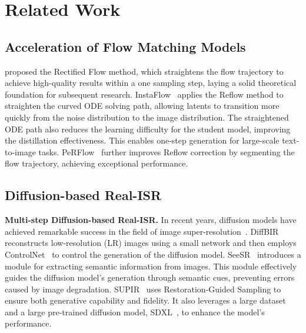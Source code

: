 \section{Related Work}
\vspace{-1mm}
\subsection{Acceleration of Flow Matching Models} 
\vspace{-1mm}
\citet{liu2022flow} proposed the Rectified Flow method, which straightens the flow trajectory to achieve high-quality results within a one sampling step, laying a solid theoretical foundation for subsequent research. InstaFlow~\cite{liu2023instaflow} applies the Reflow method to straighten the curved ODE solving path, allowing latents to transition more quickly from the noise distribution to the image distribution. The straightened ODE path also reduces the learning difficulty for the student model, improving the distillation effectiveness. This enables one-step generation for large-scale text-to-image tasks. PeRFlow~\cite{yan2024perflow} further improves Reflow correction by segmenting the flow trajectory, achieving exceptional performance. 

\vspace{-2mm}
\subsection{Diffusion-based Real-ISR}
\vspace{-1mm}
\textbf{Multi-step Diffusion-based Real-ISR.} In recent years, diffusion models have achieved remarkable success in the field of image super-resolution~\cite{wang2024exploiting, lin2023diffbir, yang2023pixel, yue2024resshift, wu2024seesr, yu2024scaling}. DiffBIR~\cite{lin2023diffbir} reconstructs low-resolution (LR) images using a small network and then employs ControlNet~\cite{zhang2023adding} to control the generation of the diffusion model. SeeSR~\cite{wu2024seesr} introduces a module for extracting semantic information from images. This module effectively guides the diffusion model's generation through semantic cues, preventing errors caused by image degradation. SUPIR~\cite{yu2024scaling} uses Restoration-Guided Sampling to ensure both generative capability and fidelity. It also leverages a large dataset and a large pre-trained diffusion model, SDXL~\cite{podell2023sdxl}, to enhance the model's performance.

